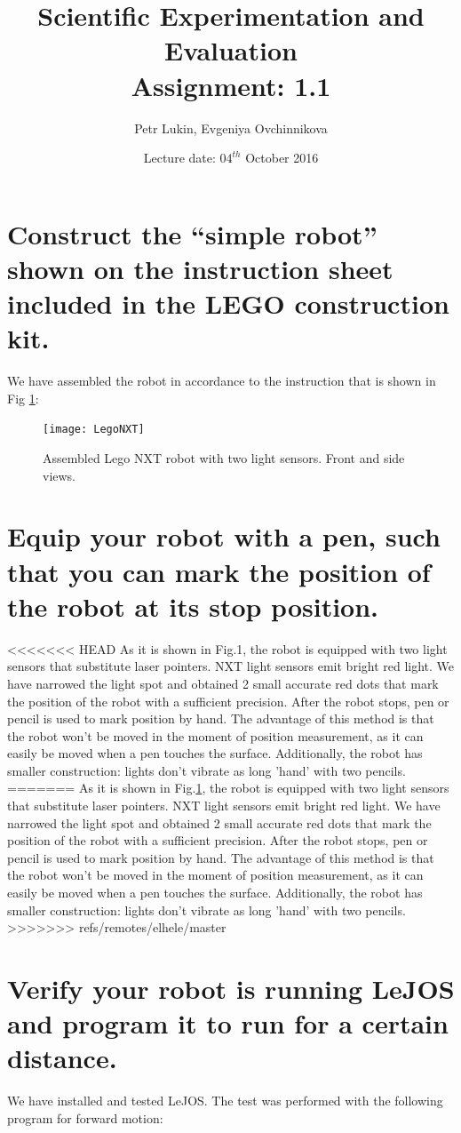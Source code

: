 \documentclass[a4paper, 12pt]{article}
\title{Scientific Experimentation and Evaluation  \\
				Assignment: 1.1}
\author{Petr Lukin, Evgeniya Ovchinnikova}
\date{Lecture date: $04^{th}$ October 2016}
\begin{document}
\maketitle

\section{Construct the “simple robot” shown on the instruction sheet included in the LEGO construction
kit.}

We have assembled the robot in accordance to the instruction that is shown in Fig \ref{fig:robot}:
\begin{figure}[h]
  \centering
  \caption{Assembled Lego NXT robot with two light sensors. Front and side views.\label{fig:robot}}
  \texttt{[image: LegoNXT]}
\end{figure}

\section{Equip your robot with a pen, such that you can mark the position of the robot at its stop
position.}
<<<<<<< HEAD
As it is shown in Fig.1, the robot is equipped with two light sensors that substitute laser pointers. NXT light sensors emit bright red light. We have narrowed the light spot and obtained 2 small accurate red dots that mark the position of the robot with a sufficient precision. After the robot stops, pen or pencil is used to mark position by hand. The advantage of this method is that the robot won't be moved in the moment of position measurement, as it can easily be moved when a pen touches the surface. Additionally, the robot has smaller construction: lights don't vibrate as long 'hand' with two pencils.
=======
As it is shown in Fig.\ref{fig:robot}, the robot is equipped with two light sensors that substitute laser pointers. NXT light sensors emit bright red light. We have narrowed the light spot and obtained 2 small accurate red dots that mark the position of the robot with a sufficient precision. After the robot stops, pen or pencil is used to mark position by hand. The advantage of this method is that the robot won't be moved in the moment of position measurement, as it can easily be moved when a pen touches the surface. Additionally, the robot has smaller construction: lights don't vibrate as long 'hand' with two pencils. 
>>>>>>> refs/remotes/elhele/master

\section{Verify your robot is running LeJOS and program it to run for a certain
distance.}
We have installed and tested LeJOS. The test was performed with the following program for forward motion:
\end{document}
